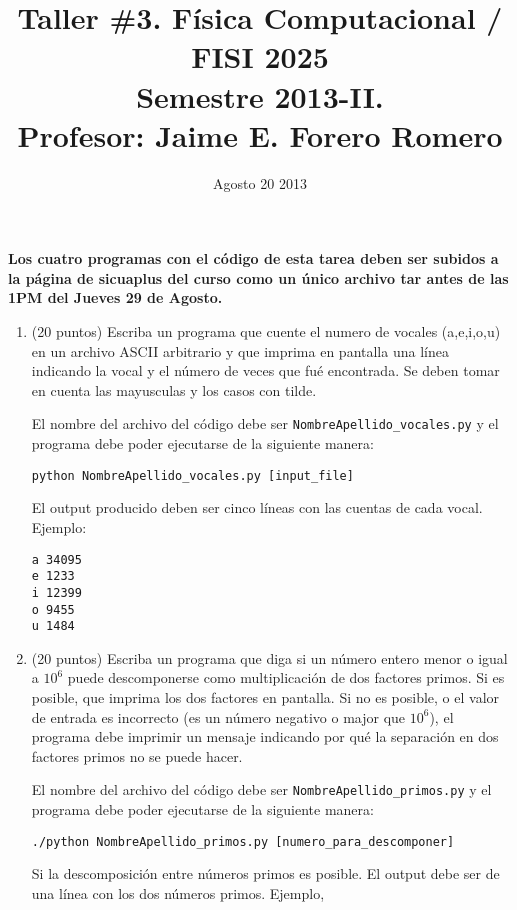 \documentclass{article}
\title{Taller \#3. F\'isica Computacional / FISI 2025 \\Semestre 2013-II. \\ Profesor: Jaime E. Forero Romero}
\date{Agosto 20 2013}
\begin{document}
\maketitle

{\bf Los cuatro programas con el c\'odigo de esta tarea deben ser subidos a la p\'agina de sicuaplus del curso como un \'unico archivo tar antes de las 1PM del Jueves 29 de Agosto.}

\begin{enumerate}


\item (20 puntos) Escriba un programa que cuente el numero de vocales (a,e,i,o,u) en un archivo ASCII arbitrario y que imprima en pantalla una l\'inea indicando la vocal y el n\'umero de veces que fu\'e encontrada. Se deben tomar en cuenta las mayusculas y los casos con tilde.

El nombre del archivo del c\'odigo debe ser \verb"NombreApellido_vocales.py" y el programa debe poder ejecutarse de la siguiente manera:

\begin{verbatim}
python NombreApellido_vocales.py [input_file]
\end{verbatim}

El output producido deben ser cinco l\'ineas con las cuentas de cada vocal. Ejemplo:

\begin{verbatim}
a 34095
e 1233
i 12399
o 9455
u 1484
\end{verbatim}

\item (20 puntos) Escriba un programa que diga si un n\'umero entero menor o igual a $10^6$ puede descomponerse como multiplicaci\'on de dos factores primos. Si es posible, que imprima los dos factores en pantalla. Si no es posible, o el valor de entrada es incorrecto (es un n\'umero negativo o major que $10^6$), el programa debe imprimir un mensaje indicando por qu\'e la separaci\'on en dos factores primos no se puede hacer.


El nombre del archivo del c\'odigo debe ser \verb"NombreApellido_primos.py" y el programa debe poder ejecutarse de la siguiente manera:

\begin{verbatim}
./python NombreApellido_primos.py [numero_para_descomponer]
\end{verbatim}

Si la descomposici\'on entre n\'umeros primos es posible. El output debe ser de una l\'inea con los dos n\'umeros primos. Ejemplo,


\end{enumerate}
\end{document}
